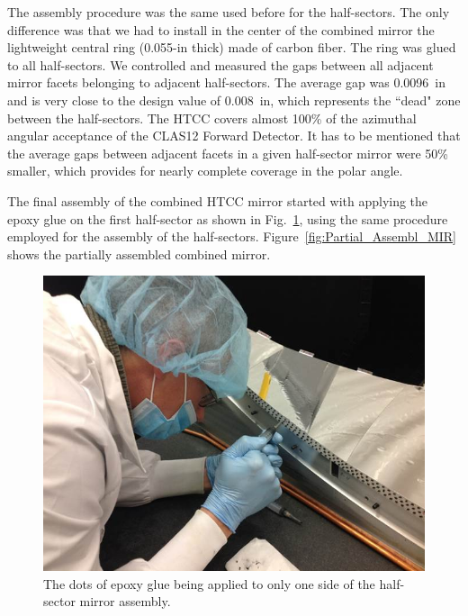 The assembly procedure was the same used before for the half-sectors. The only difference was that we had to
install in the center of the combined mirror the lightweight central ring (0.055-in thick) made of carbon fiber.
The ring was glued to all half-sectors. We controlled and measured the gaps between all adjacent mirror facets
belonging to adjacent half-sectors. The average gap was 0.0096~in and is very close to the design value of
0.008~in, which represents the ``dead" zone between the half-sectors. The HTCC covers almost 100\% of the
azimuthal angular acceptance of the CLAS12 Forward Detector. It has to be mentioned that the average gaps
between adjacent facets in a given half-sector mirror were 50\% smaller, which provides for nearly complete
coverage in the polar angle. 

The final assembly of the combined HTCC mirror started with applying the epoxy glue on the first half-sector as
shown in Fig.~\ref{fig:Ap_Gl_Half_Sect}, using the same procedure employed for the assembly of the
half-sectors. Figure~\ref{fig:Partial_Assembl_MIR} shows the partially assembled combined mirror.
 
\begin{figure}[ht]
    \centering
    \includegraphics[width=1.0\linewidth]{images/Ap_Gl_Half_Sect.jpg}
    \caption{The dots of epoxy glue being applied to only one side of the half-sector mirror assembly.}
    \label{fig:Ap_Gl_Half_Sect}
\end{figure}
 
